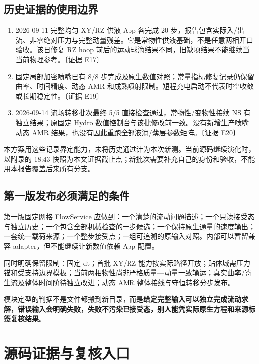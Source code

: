 \documentclass[UTF8,a4paper,11pt,fontset=fandol]{ctexart}
\newcommand{\ev}[1]{{\small\color{muted}〔证据 #1〕}}
\begin{document}
\subsection{历史证据的使用边界}
\begin{enumerate}
 \item 2026-09-11 完整均匀 XY/RZ 供液 App 各完成 20 步，报告包含实际入/出流、非零绝对压力与完整动量残差。它是常物性供液基础，不是任意两相开口验收。该日修复 RZ hoop 前后的运动球滴结果不同，旧缺项结果不能继续当当前物理参考。\ev{E17}
 \item 固定局部加密喷嘴已有 8/8 步完成及原生数值对照；常量指标修复记录仍保留曲率、时间精度、动态 AMR 和成熟喷射限制。短程充电启动不代表时空收敛或长期稳定性。\ev{E19}
 \item 2026-09-14 流场转移批次最终 5/5 直接检查通过，常物性/变物性接续 NS 有独立结果；原固定 Hydro 数值控制台与该批修改前一致。没有新增生产喷嘴动态 AMR 结果，也没有因此重跑全部液滴/薄层参数矩阵。\ev{E20}
\end{enumerate}
本方案用这些记录界定能力，未将历史通过计为本次新测。当前源码继续演化时，以附录的 18:43 快照为本文证据截止点；新批次需要补充自己的身份和验收，不能用本报告覆盖后来所有分支。

\subsection{第一版发布必须满足的条件}
第一版固定网格 FlowService 应做到：一个清楚的流动问题描述；一个只读接受态与独立历史；一个包含全部机械检查的一步候选；一个保持原生通量的速度输出；一套统一载荷来源；一个整步接受点；一组可追溯的原输入对照。内部可以暂留兼容 adapter，但不能继续让新数值依赖 App 配置。

同时明确保留限制：固定 dt；首批 XY/RZ 能力按实际路径开放；贴体域需压力锚和受支持边界模板；当前两相物性尚非严格质量—动量一致输运；真实曲率/寄生流及整体时间阶待独立改进；动态 AMR 整体接线与守恒转移分步发布。

模块定型的判据不是文件都搬到新目录，而是\textbf{给定完整输入可以独立完成流动求解，错误输入会明确失败，失败不污染已接受态，别人能凭实际原生方程和来源标签复核结果}。

\clearpage
\appendix
\section{源码证据与复核入口}
\end{document}
